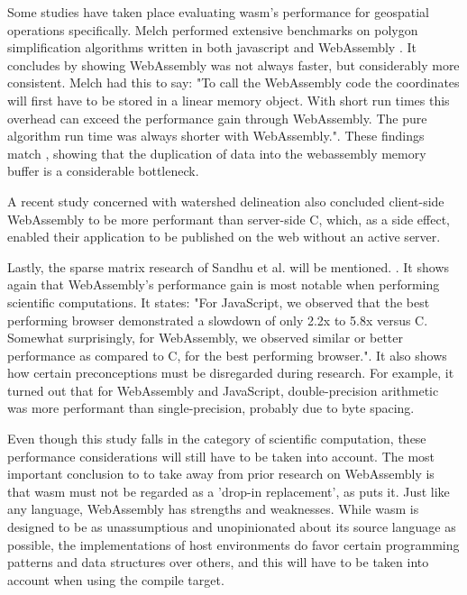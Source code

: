 Some studies have taken place evaluating \ac{wasm}'s performance for geospatial operations specifically. 
Melch performed extensive benchmarks on polygon simplification algorithms written in both javascript and WebAssembly \cite{melch_performance_2019}. 
It concludes by showing WebAssembly was not always faster, but considerably more consistent. 
Melch had this to say: "To call the WebAssembly code the coordinates will first have to be stored in a linear memory object. 
With short run times this overhead can exceed the performance gain through WebAssembly. 
The pure algorithm run time was always shorter with WebAssembly.". 
These findings match \cite{jangda_not_2019}, showing that the duplication of data into the webassembly memory buffer is a considerable bottleneck.

A recent study concerned with watershed delineation \cite{sit_optimized_2019} also concluded client-side WebAssembly to be more performant than server-side C, which, as a side effect, enabled their application to be published on the web without an active server. 

Lastly, the sparse matrix research of Sandhu et al. will be mentioned. \cite{sandhu_sparse_2018}. It shows again that WebAssembly's performance gain is most notable when performing scientific computations. It states: "For JavaScript, we observed that the best performing browser demonstrated a slowdown of only 2.2x to 5.8x versus C. Somewhat surprisingly, for WebAssembly, we observed similar or better performance as compared to C, for the best performing browser.". It also shows how certain preconceptions must be disregarded during research. For example, it turned out that for WebAssembly and JavaScript, double-precision arithmetic was more performant than single-precision, probably due to byte spacing.

Even though this study falls in the category of scientific computation, these performance considerations will still have to be taken into account. The most important conclusion to to take away from prior research on WebAssembly is that \ac{wasm} must not be regarded as a 'drop-in replacement', as \cite{melch_performance_2019} puts it. Just like any language, WebAssembly has strengths and weaknesses. While \ac{wasm} is designed to be as unassumptious and unopinionated about its source language as possible, the implementations of host environments do favor certain programming patterns and data structures over others, and this will have to be taken into account when using the compile target.

